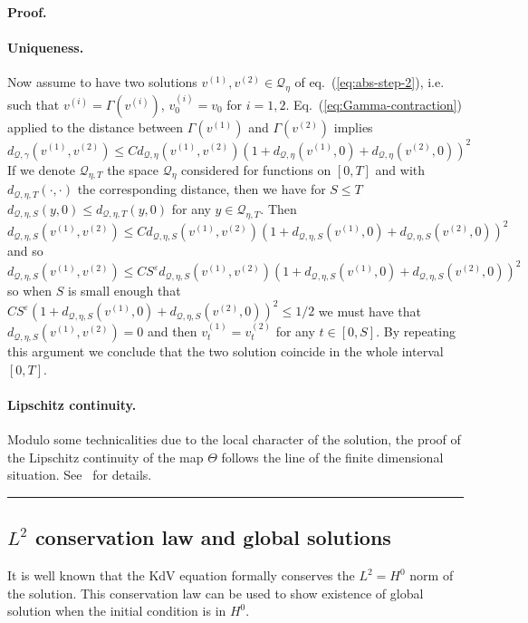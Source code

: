 \documentclass[a4paper,12pt,reqno]{article}
\newcommand{\eps}{\varepsilon}
\newcommand{\QQ}{\mathcal{Q}}
\newenvironment{proof}[1][Proof]{\textbf{#1.} }{\ \rule{0.5em}{0.5em}}
\begin{document}
\begin{proof}
\paragraph{Uniqueness.} Now assume to have two solutions 
$v^{(1)},v^{(2)} \in \QQ_\eta$ of eq.~(\ref{eq:abs-step-2}), i.e. such
that $v^{(i)} = \Gamma(v^{(i)})$, $v^{(i)}_0 = v_0$ for
$i=1,2$. Eq.~(\ref{eq:Gamma-contraction}) applied to the distance between $\Gamma(v^{(1)})
$ and $\Gamma(v^{(2)})$ implies
\begin{equation*}
 d_{\QQ,\gamma}(v^{(1)},v^{(2)}) \le C  d_{\QQ,\eta}(v^{(1)},v^{(2)}) (1+ d_{\QQ,\eta}(v^{(1)},0)+ d_{\QQ,\eta}(v^{(2)},0))^2   
\end{equation*}
If we denote $\QQ_{\eta,T}$ the space $\QQ_{\eta}$ considered for
functions on $[0,T]$ and with $ d_{\QQ,\eta,T}(\cdot,\cdot)$ the
corresponding distance, then we have for $S \le T$
$
 d_{\QQ,\eta,S}(y,0) \le   d_{\QQ,\eta,T}(y,0)
$ for any $y \in \QQ_{\eta,T}$. Then
\begin{equation*}
 d_{\QQ,\eta,S}(v^{(1)},v^{(2)}) \le C  d_{\QQ,\eta,S}(v^{(1)},v^{(2)}) (1+ d_{\QQ,\eta,S}(v^{(1)},0)+ d_{\QQ,\eta,S}(v^{(2)},0))^2   
\end{equation*}
and so
\begin{equation*}
 d_{\QQ,\eta,S}(v^{(1)},v^{(2)}) \le C S^\eps  d_{\QQ,\eta,S}(v^{(1)},v^{(2)}) (1+ d_{\QQ,\eta,S}(v^{(1)},0)+ d_{\QQ,\eta,S}(v^{(2)},0))^2   
\end{equation*}
so when $S$ is small enough that $C S^\eps
(1+ d_{\QQ,\eta,S}(v^{(1)},0)+ d_{\QQ,\eta,S}(v^{(2)},0))^2  \le 1/2  $ we
must have that $ d_{\QQ,\eta,S}(v^{(1)},v^{(2)}) = 0$ and then
$v^{(1)}_t = v^{(2)}_t$ for any $t \in [0,S]$. By repeating this
argument  we conclude that the two solution coincide in the whole interval
$[0,T]$.

\paragraph{Lipschitz continuity.}
Modulo some technicalities due to the local character of the solution, the proof of the Lipschitz continuity of the map $\Theta$ follows the line of the finite dimensional situation. See~\cite{MR2091358} for details.
\end{proof}


\subsection{$L^2$ conservation law and global solutions}
\label{sec:global}
It is well known that the KdV equation formally conserves the $L^2 =
H^0$ norm of the solution. This conservation law can be used to show
existence of global solution when the initial condition is in $H^0$. 
\end{document}
